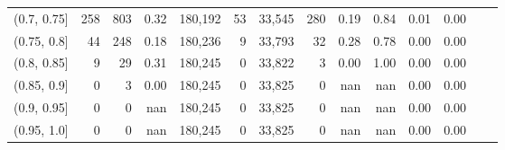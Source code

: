 \begin{tabular}{rrrrrrrrrrrrrr}
(0.7, 0.75]    &     258 &    803 &    0.32 &  180,192 &       53 &  33,545 &     280 &  0.19 &  0.84 &  0.01 &      0.00 \\
(0.75, 0.8]    &      44 &    248 &    0.18 &  180,236 &        9 &  33,793 &      32 &  0.28 &  0.78 &  0.00 &      0.00 \\
(0.8, 0.85]    &       9 &     29 &    0.31 &  180,245 &        0 &  33,822 &       3 &  0.00 &  1.00 &  0.00 &      0.00 \\
(0.85, 0.9]    &       0 &      3 &    0.00 &  180,245 &        0 &  33,825 &       0 &   nan &   nan &  0.00 &      0.00 \\
(0.9, 0.95]    &       0 &      0 &     nan &  180,245 &        0 &  33,825 &       0 &   nan &   nan &  0.00 &      0.00 \\
(0.95, 1.0]    &       0 &      0 &     nan &  180,245 &        0 &  33,825 &       0 &   nan &   nan &  0.00 &      0.00 \\
\bottomrule
\end{tabular}
